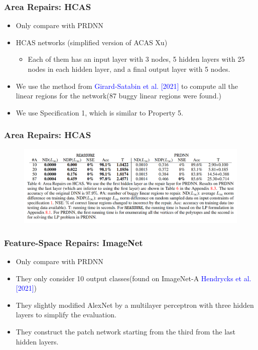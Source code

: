 \documentclass[aspectratio=169 %
,serif,mathserif]{beamer}
\begin{document}
\begin{frame}
	\frametitle{Area Repairs: HCAS}
	\begin{itemize}
		\item Only compare with PRDNN \pause
		\item HCAS networks (simplified version of ACAS Xu)
		\begin{itemize}
			\item Each of them has an input layer with 3 nodes, 5 hidden layers with 25 nodes in each hidden layer, and a final output layer with 5 nodes. 
		\end{itemize} \pause
		\item We use the method from \textcolor{blue}{Girard-Satabin et al. [2021]} to compute all the linear regions for the network(87 buggy linear regions were found.) \pause
		\item We use Specification 1, which is similar to Property 5.
	\end{itemize}
\end{frame}

\begin{frame}
	\frametitle{Area Repairs: HCAS}
	\begin{figure}[htbp]
		\includegraphics[width=\linewidth]{11.png}
	\end{figure}
\end{frame}

\begin{frame}
	\frametitle{Feature-Space Repairs: ImageNet}
	\begin{itemize}
		\item Only compare with PRDNN \pause
		\item They only consider 10 output classes(found on ImageNet-A \textcolor{blue}{Hendrycks et al. [2021]})\pause
		\item They slightly modified AlexNet by a multilayer perceptron with three hidden layers to simplify the evaluation.
		\item They construct the patch network starting from the third from the last hidden layers.
	\end{itemize}
\end{frame}
\end{document}
